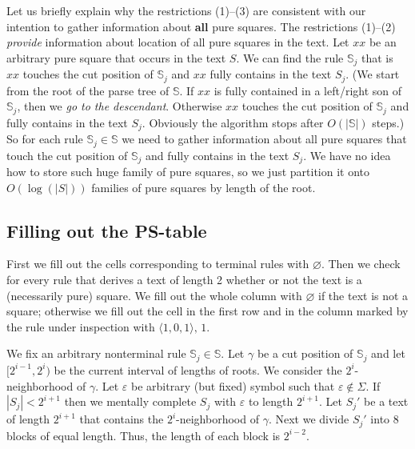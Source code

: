 \documentclass[11pt]{article}
\begin{document}
Let us briefly explain why the restrictions (1)--(3) are consistent with our intention to gather information about
\textbf{all} pure squares. The restrictions (1)--(2) \emph{provide} information about location of all pure squares
in the text. Let $xx$ be an arbitrary pure square that occurs in the text $S$. We can find the rule $\mathbb{S}_j$
that is $xx$ touches the cut position of $\mathbb{S}_j$ and $xx$ fully contains in the text $S_j$. (We start from
the root of the parse tree  of $\mathbb{S}$. If $xx$ is fully contained in a left/right son of $\mathbb{S}_j$,
then we \emph{go to the descendant}. Otherwise $xx$ touches the cut position of $\mathbb{S}_j$ and fully contains
in the text $S_j$. Obviously the algorithm stops after $O(|\mathbb{S}|)$ steps.) So for each rule $\mathbb{S}_j
\in \mathbb{S}$ we need to gather information about all pure squares that touch the cut position of $\mathbb{S}_j$
and fully contains in the text $S_j$. We have no idea how to store such huge family of pure squares, so we just
partition it onto $O(\log(|S|))$ families of pure squares by length of the root.

\subsection{Filling out the PS-table}


First we fill out the cells corresponding to terminal rules with $\varnothing$. Then we check for every rule that
derives a text of length 2 whether or not the text is a (necessarily pure) square. We fill out the whole column
with $\varnothing$ if the text is not a square; otherwise we fill out the cell in the first row and in the column
marked by the rule under inspection with $\langle1, 0, 1\rangle,\,1$.

\begin{figure}[t]
\SquareSearchingIdea{}
\end{figure}


We fix an arbitrary nonterminal rule $\mathbb{S}_j \in \mathbb{S}$. Let $\gamma$ be a cut position of
$\mathbb{S}_j$ and let $[2^{i-1}, 2^i)$ be the current interval of lengths of roots. We consider the
$2^i$-neighborhood of $\gamma$. Let $\varepsilon$ be arbitrary (but fixed) symbol such that $\varepsilon \notin
\Sigma$. If $|S_j| < 2^{i+1}$ then we mentally complete $S_j$ with $\varepsilon$ to length $2^{i+1}$. Let $S_j'$
be a text of length $2^{i+1}$ that contains the $2^i$-neighborhood of $\gamma$. Next we divide $S_j'$ into 8
blocks of equal length. Thus, the length of each block is $2^{i-2}$.
\end{document}
